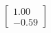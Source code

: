 \documentclass[preview]{standalone}
\begin{document}
\begin{align*}
\begin{bmatrix} 1.00 \\ -0.59 \end{bmatrix}
\end{align*}
\end{document}
